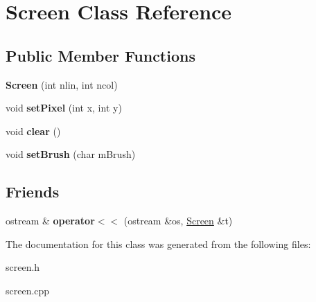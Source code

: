 \hypertarget{class_screen}{}\section{Screen Class Reference}
\label{class_screen}
\subsection*{Public Member Functions}
\begin{DoxyCompactItemize}
\item 
\mbox{\label{class_screen_a246eac542489ef06335800fae60827ee}} 
{\bfseries Screen} (int nlin, int ncol)
\item 
\mbox{\label{class_screen_ae6bea81c57a22d226507c3c26fa95ee0}} 
void {\bfseries set\+Pixel} (int x, int y)
\item 
\mbox{\label{class_screen_a35e74266b2a04e37b354ceff7a5f1031}} 
void {\bfseries clear} ()
\item 
\mbox{\label{class_screen_a6fd1e169a3830091a5775a105bcfd1a8}} 
void {\bfseries set\+Brush} (char m\+Brush)
\end{DoxyCompactItemize}
\subsection*{Friends}
\begin{DoxyCompactItemize}
\item 
\mbox{\label{class_screen_aab6a2880746bfe1b7964817cc8f0989e}} 
ostream \& {\bfseries operator$<$$<$} (ostream \&os, \mbox{\hyperlink{class_screen}{Screen}} \&t)
\end{DoxyCompactItemize}


The documentation for this class was generated from the following files\+:\begin{DoxyCompactItemize}
\item 
screen.\+h\item 
screen.\+cpp\end{DoxyCompactItemize}
